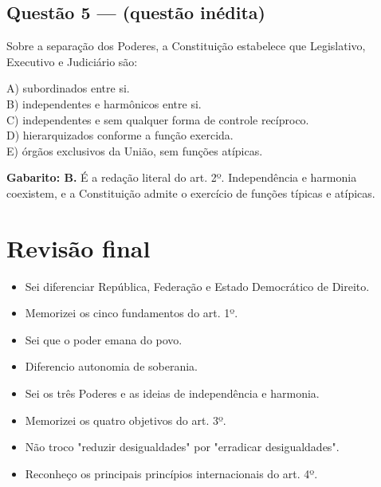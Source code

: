 \documentclass[11pt,a4paper]{article}
\begin{document}
\subsection*{Questão 5 — (questão inédita)}

Sobre a separação dos Poderes, a Constituição estabelece que Legislativo, Executivo e Judiciário são:

A) subordinados entre si. \\ B) independentes e harmônicos entre si. \\ C) independentes e sem qualquer forma de controle recíproco. \\ D) hierarquizados conforme a função exercida. \\ E) órgãos exclusivos da União, sem funções atípicas.

\begin{alerta}
\textbf{Gabarito: B.} É a redação literal do art. 2º. Independência e harmonia coexistem, e a Constituição admite o exercício de funções típicas e atípicas.
\end{alerta}

\section*{Revisão final}

\begin{itemize}
  \item[$\square$] Sei diferenciar República, Federação e Estado Democrático de Direito.
  \item[$\square$] Memorizei os cinco fundamentos do art. 1º.
  \item[$\square$] Sei que o poder emana do povo.
  \item[$\square$] Diferencio autonomia de soberania.
  \item[$\square$] Sei os três Poderes e as ideias de independência e harmonia.
  \item[$\square$] Memorizei os quatro objetivos do art. 3º.
  \item[$\square$] Não troco "reduzir desigualdades" por "erradicar desigualdades".
  \item[$\square$] Reconheço os principais princípios internacionais do art. 4º.
\end{itemize}
\end{document}
